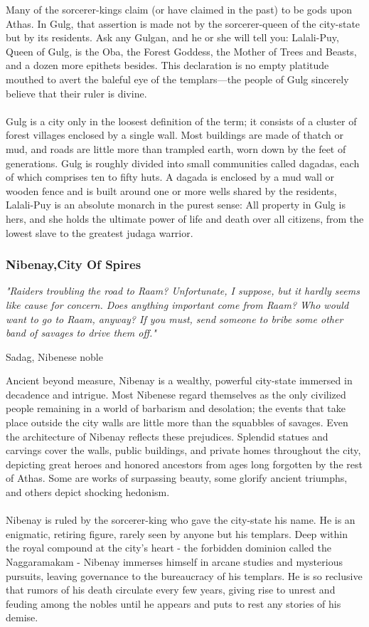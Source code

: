 \begin{multicols}{2}
Many of the sorcerer-kings claim (or have claimed
in the past) to be gods upon Athas. In Gulg, that
assertion is made not by the sorcerer-queen of the
city-state but by its residents. Ask any Gulgan, and
he or she will tell you: Lalali-Puy, Queen of Gulg, is
the Oba, the Forest Goddess, the Mother of Trees
and Beasts, and a dozen more epithets besides. This
declaration is no empty platitude mouthed to avert
the baleful eye of the templars—the people of Gulg
sincerely believe that their ruler is divine.\\
\\
Gulg is a city only in the loosest definition of the
term; it consists of a cluster of forest villages enclosed
by a single wall. Most buildings are made of thatch or
mud, and roads are little more than trampled earth,
worn down by the feet of generations. Gulg is roughly
divided into small communities called dagadas,
each of which comprises ten to fifty huts. A dagada is
enclosed by a mud wall or wooden fence and is built
around one or more wells shared by the residents,
Lalali-Puy is an absolute monarch in the purest
sense: All property in Gulg is hers, and she holds the
ultimate power of life and death over all citizens,
from the lowest slave to the greatest judaga warrior.\\

\subsubsection{Nibenay,City Of Spires}
\epigraph{\textit{
"Raiders troubling the road to Raam? Unfortunate, I
suppose, but it hardly seems like cause for concern. Does
anything important come from Raam? Who would want
to go to Raam, anyway? If you must, send someone to bribe
some other band of savages to drive them off." }}
{ Sadag, Nibenese noble }

Ancient beyond measure, Nibenay is a wealthy, powerful
city-state immersed in decadence and intrigue.
Most Nibenese regard themselves as the only civilized
people remaining in a world of barbarism and
desolation; the events that take place outside the city
walls are little more than the squabbles of savages.
Even the architecture of Nibenay reflects these prejudices.
Splendid statues and carvings cover the walls,
public buildings, and private homes throughout the
city, depicting great heroes and honored ancestors
from ages long forgotten by the rest of Athas. Some
are works of surpassing beauty, some glorify ancient
triumphs, and others depict shocking hedonism.\\
\\
Nibenay is ruled by the sorcerer-king who gave
the city-state his name. He is an enigmatic, retiring
figure, rarely seen by anyone but his templars. Deep
within the royal compound at the city's heart - the
forbidden dominion called the Naggaramakam - 
Nibenay immerses himself in arcane studies and
mysterious pursuits, leaving governance to the
bureaucracy of his templars. He is so reclusive that
rumors of his death circulate every few years, giving
rise to unrest and feuding among the nobles until he
appears and puts to rest any stories of his demise.\\


\end{multicols}
